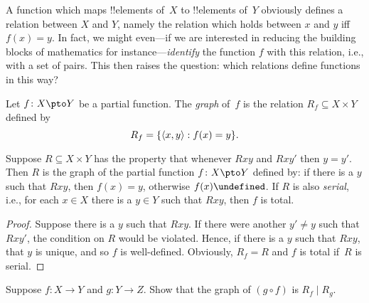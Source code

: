 \documentclass[../../../include/open-logic-section]{subfiles}
\begin{document}


\begin{explain}
A function which maps !!{element}s of~$X$ to !!{element}s of~$Y$
obviously defines a relation between $X$ and $Y$, namely the relation
which holds between $x$ and $y$ iff $f(x) = y$.  In fact, we might
even---if we are interested in reducing the building blocks of
mathematics for instance---\emph{identify} the function $f$ with this
relation, i.e., with a set of pairs.  This then raises the question:
which relations define functions in this way?
\end{explain}

\begin{defn}
Let $f\colon X \pto Y$ be a partial function. The \emph{graph} of~$f$
is the relation $R_f \subseteq X \times Y$ defined by
\[
R_f = \{ \langle x,y \rangle : f(x) = y \}.
\]
\end{defn}

\begin{prop}
Suppose $R \subseteq X \times Y$ has the property that whenever $Rxy$
and $Rxy'$ then $y = y'$.  Then $R$ is the graph of the partial
function $f\colon X \pto Y$ defined by: if there is a $y$ such that
$Rxy$, then $f(x) = y$, otherwise $f(x) \undefined$.  If $R$ is also 
\emph{serial}, i.e., for each $x \in X$ there is a $y \in Y$ such that
$Rxy$, then $f$ is total.
\end{prop}

\begin{proof}
Suppose there is a $y$ such that $Rxy$.  If there were another $y'
\neq y$ such that $Rxy'$, the condition on $R$ would be
violated. Hence, if there is a $y$ such that $Rxy$, that $y$ is
unique, and so $f$ is well-defined.  Obviously, $R_f = R$ and $f$ is
total if~$R$ is serial.
\end{proof}

\begin{prob}
Suppose $f \colon X \to Y$ and $g \colon Y \to Z$. Show that the graph
of $(g \circ f)$ is $R_f \mid R_g$.
\end{prob}
\end{document}
